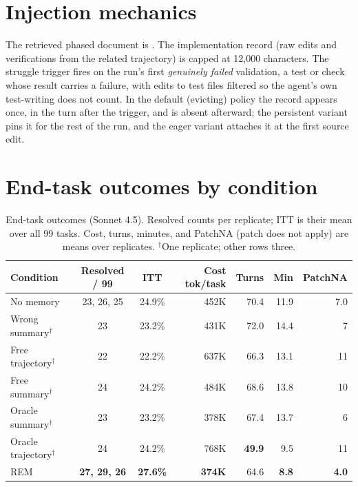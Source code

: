 \documentclass{article}
\newcommand{\sysname}{REM}
\begin{document}
\section{Injection mechanics}
\label{app:delivery}

The retrieved phased document is . The implementation record (raw edits and verifications from the related trajectory) is capped at 12{,}000 characters. The struggle trigger fires on the run's first \emph{genuinely failed} validation, a test or check whose result carries a failure, with edits to test files filtered so the agent's own test-writing does not count. In the default (evicting) policy the record appears once, in the turn after the trigger, and is absent afterward; the persistent variant pins it for the rest of the run, and the eager variant attaches it at the first source edit.

\section{End-task outcomes by condition}
\label{app:outcomes}

\begin{table}[h]
\begin{center}
\begin{tabular}{@{}lccrrrr@{}}
\toprule
\textbf{Condition} & \textbf{Resolved / 99} & \textbf{ITT} & \textbf{Cost tok/task} & \textbf{Turns} & \textbf{Min} & \textbf{PatchNA} \\
\midrule
No memory & 23, 26, 25 & 24.9\% & 452K & 70.4 & 11.9 & 7.0 \\
Wrong summary$^\dagger$ & 23 & 23.2\% & 431K & 72.0 & 14.4 & 7 \\
Free trajectory$^\dagger$ & 22 & 22.2\% & 637K & 66.3 & 13.1 & 11 \\
Free summary$^\dagger$ & 24 & 24.2\% & 484K & 68.6 & 13.8 & 10 \\
Oracle summary$^\dagger$ & 23 & 23.2\% & 378K & 67.4 & 13.7 & 6 \\
Oracle trajectory$^\dagger$ & 24 & 24.2\% & 768K & \textbf{49.9} & 9.5 & 11 \\
\midrule
\sysname{} & \textbf{27, 29, 26} & \textbf{27.6\%} & \textbf{374K} & 64.6 & \textbf{8.8} & \textbf{4.0} \\
\bottomrule
\end{tabular}
\end{center}
\caption{End-task outcomes (Sonnet 4.5). Resolved counts per replicate; ITT is their mean over all 99 tasks. Cost, turns, minutes, and PatchNA (patch does not apply) are means over replicates. $^\dagger$One replicate; other rows three.}
\label{tab:outcomes}
\end{table}
\end{document}

